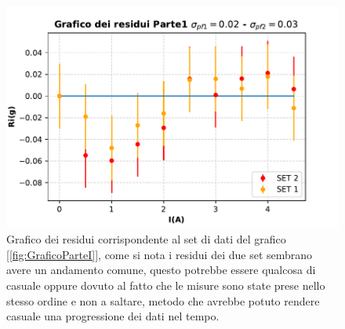 {\begin{figure}[H]
  \centering
  \includegraphics[width=13.5cm]{Figures/Residui_Parte1.pdf}
  \caption{Grafico dei residui corrispondente al set di dati del grafico [\ref{fig:GraficoParteI}], come si nota i residui dei due set sembrano avere un andamento comune, questo potrebbe essere qualcosa di casuale oppure dovuto al fatto che le misure sono state prese nello stesso ordine e non a saltare, metodo che avrebbe potuto rendere casuale una progressione dei dati nel tempo.}   
  \label{fig:GraficoResiduiParteI}
\end{figure}
\par}
